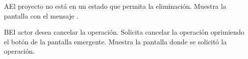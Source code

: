  \begin{UCtrayectoriaA}{A}{El proyecto no está en un estado que permita la eliminación.}
    \UCpaso[\UCsist] Muestra la pantalla  con el mensaje .
 \end{UCtrayectoriaA} 
 \begin{UCtrayectoriaA}{B}{El actor desea cancelar la operación.}
    \UCpaso[\UCactor] Solicita cancelar la operación oprimiendo el botón  de la pantalla emergente.
    \UCpaso[\UCsist] Muestra la pantalla donde se solicitó la operación.
 \end{UCtrayectoriaA} 